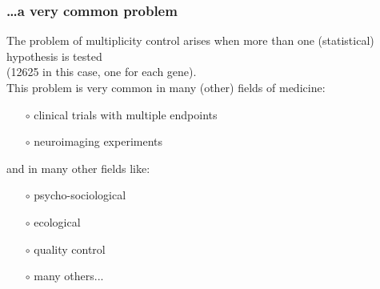 \documentclass[xcolor={pdftex,dvipsnames,table}]{beamer}
\begin{document}
\begin{frame}
\frametitle{\ldots a very common problem}

The problem of multiplicity control arises when more than one (statistical) hypothesis is tested \\(12625 in this case, one for each gene).\\
\bigskip
This problem is very common in many (other) fields of medicine:
\begin{itemize}
\item[$\circ$] clinical trials with multiple endpoints
\item[$\circ$] neuroimaging experiments
\end{itemize}
and in many other fields like:
\begin{itemize}
\item[$\circ$] psycho-sociological
\item[$\circ$] ecological
\item[$\circ$] quality control
\item[$\circ$] many others...
\end{itemize}

\end{frame}
\end{document}
